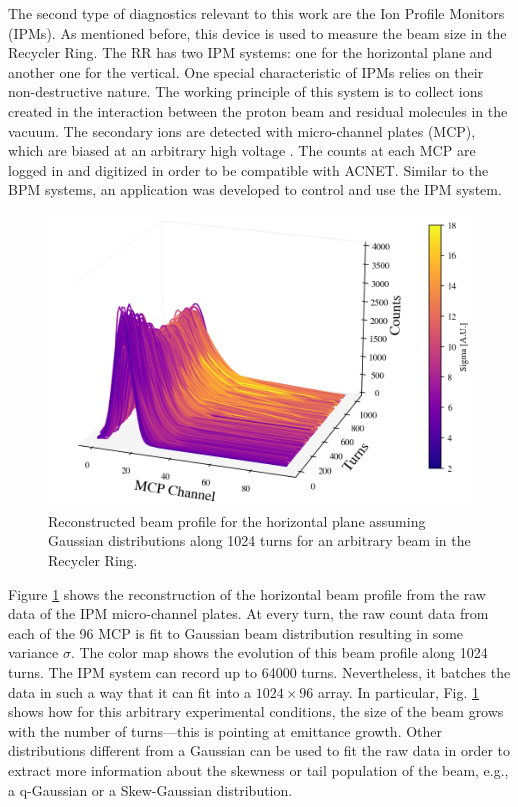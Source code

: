 The second type of diagnostics relevant to this work are the Ion Profile Monitors (IPMs). As mentioned before, this device is used to measure the beam size in the Recycler Ring. The RR has two IPM systems: one for the horizontal plane and another one for the vertical. One special characteristic of IPMs relies on their non-destructive nature. The working principle of this system is to collect ions created in the interaction between the proton beam and residual molecules in the vacuum. The secondary ions are detected with micro-channel plates (MCP), which are biased at an arbitrary high voltage \cite{betiay}. The counts at each MCP are logged in and digitized in order to be compatible with ACNET. Similar to the BPM systems, an application was developed to control and use the IPM system.     

\begin{figure}[H]
   \centering
   \includegraphics[width=\columnwidth]{chapter3/ipm.png}
   \caption{Reconstructed beam profile for the horizontal plane assuming Gaussian distributions along 1024 turns for an arbitrary beam in the Recycler Ring.}
   \label{fig:ipm0}
\end{figure}

Figure \ref{fig:ipm0} shows the reconstruction of the horizontal beam profile from the raw data of the IPM micro-channel plates. At every turn, the raw count data from each of the 96 MCP is fit to Gaussian beam distribution resulting in some variance $\sigma$. The color map shows the evolution of this beam profile along 1024 turns. The IPM system can record up to 64000 turns. Nevertheless, it batches the data in such a way that it can fit into a $1024 \times 96$ array. In particular, Fig. \ref{fig:ipm0} shows how for this arbitrary experimental conditions, the size of the beam grows with the number of turns---this is pointing at emittance growth. Other distributions different from a Gaussian can be used to fit the raw data in order to extract more information about the skewness or tail population of the beam, e.g., a q-Gaussian or a Skew-Gaussian distribution.

